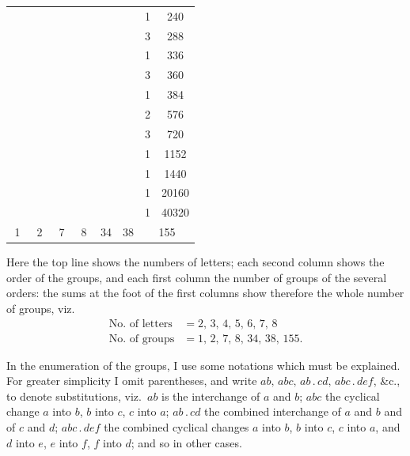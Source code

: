 \documentclass[11pt]{article}
\begin{document}
\begin{center}
\begin{tabular}{|cc|cc|cc|cc|cc|cc|cc|}
  &   &   &   &   &   &   &    &   &     &   &      & 1 & 240\\
  &   &   &   &   &   &   &    &   &     &   &      & 3 & 288\\
  &   &   &   &   &   &   &    &   &     &   &      & 1 & 336\\
  &   &   &   &   &   &   &    &   &     &   &      & 3 & 360\\
  &   &   &   &   &   &   &    &   &     &   &      & 1 & 384\\
  &   &   &   &   &   &   &    &   &     &   &      & 2 & 576\\
  &   &   &   &   &   &   &    &   &     &   &      & 3 & 720\\
  &   &   &   &   &   &   &    &   &     &   &      & 1 & 1152\\
  &   &   &   &   &   &   &    &   &     &   &      & 1 & 1440\\
  &   &   &   &   &   &   &    &   &     &   &      & 1 & 20160\\
  &   &   &   &   &   &   &    &   &     &   &      & 1 & 40320\\
\hline
\multicolumn{2}{|c|}{1} & \multicolumn{2}{c|}{2} & \multicolumn{2}{c|}{7} & \multicolumn{2}{c|}{8} & \multicolumn{2}{c|}{34} & \multicolumn{2}{c|}{38} & \multicolumn{2}{c|}{155}\\
\hline
\end{tabular}
\end{center}

\smallskip
\hspace{1em} Here the top line shows the numbers of letters; each second
column shows the order of the groups, and each first column the number of
groups of the several orders: the sums at the foot of the first columns show
therefore the whole number of groups, viz.
\begin{align*}
\text{No.\ of letters} &= 2,\,3,\,4,\,5,\,6,\,7,\,8\\
\text{No.\ of groups} &= 1,\,2,\,7,\,8,\,34,\,38,\,155.
\end{align*}

\hspace{1em} In the enumeration of the groups, I use some notations which
must be explained. For greater simplicity I omit parentheses, and write
$ab,\,abc,\,ab\,.\,cd,\,abc\,.\,def$, \&c., to denote substitutions, viz.\
$ab$ is the interchange of $a$ and $b$; $abc$ the cyclical change $a$ into
$b$, $b$ into $c$, $c$ into $a$; $ab\,.\,cd$ the combined interchange of $a$
and $b$ and of $c$ and $d$; $abc\,.\,def$ the combined cyclical changes
$a$ into $b$, $b$ into $c$, $c$ into $a$, and $d$ into $e$, $e$ into $f$,
$f$ into $d$; and so in other cases.
\end{document}
